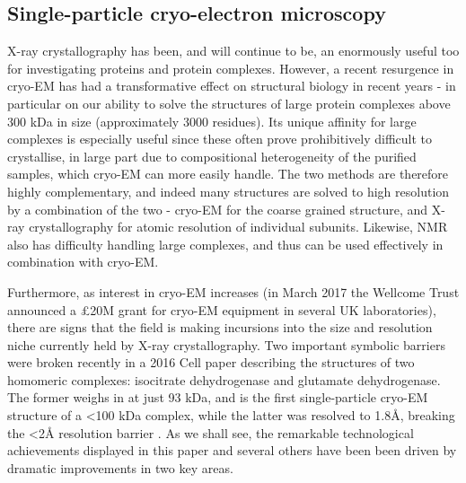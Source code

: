 \documentclass[a4paper,11pt,twoside,openright]{scrbook}
\begin{document}
\subsection{Single-particle cryo-electron microscopy}
X-ray crystallography has been, and will continue to be, an enormously useful too for investigating proteins and protein complexes. However, a recent resurgence in cryo-EM has had a transformative effect on structural biology in recent years - in particular on our ability to solve the structures of large protein complexes above 300 kDa in size (approximately 3000 residues). Its unique affinity for large complexes is especially useful since these often prove prohibitively difficult to crystallise, in large part due to compositional heterogeneity of the purified samples, which cryo-EM can more easily handle. The two methods are therefore highly complementary, and indeed many structures are solved to high resolution by a combination of the two - cryo-EM for the coarse grained structure, and X-ray crystallography for atomic resolution of individual subunits. Likewise, NMR also has difficulty handling large complexes, and thus can be used effectively in combination with cryo-EM.

Furthermore, as interest in cryo-EM increases (in March 2017 the Wellcome Trust announced a £20M grant for cryo-EM equipment in several UK laboratories), there are signs that the field is making incursions into the size and resolution niche currently held by X-ray crystallography. Two important symbolic barriers were broken recently in a 2016 Cell paper describing the structures of two homomeric complexes: isocitrate dehydrogenase and glutamate dehydrogenase. The former weighs in at just 93 kDa, and is the first single-particle cryo-EM structure of a <100 kDa complex, while the latter was resolved to 1.8Å, breaking the <2Å resolution barrier \cite{Merk2016}. As we shall see, the remarkable technological achievements displayed in this paper and several others have been been driven by dramatic improvements in two key areas\cite{Bai2015}.

\end{document}
